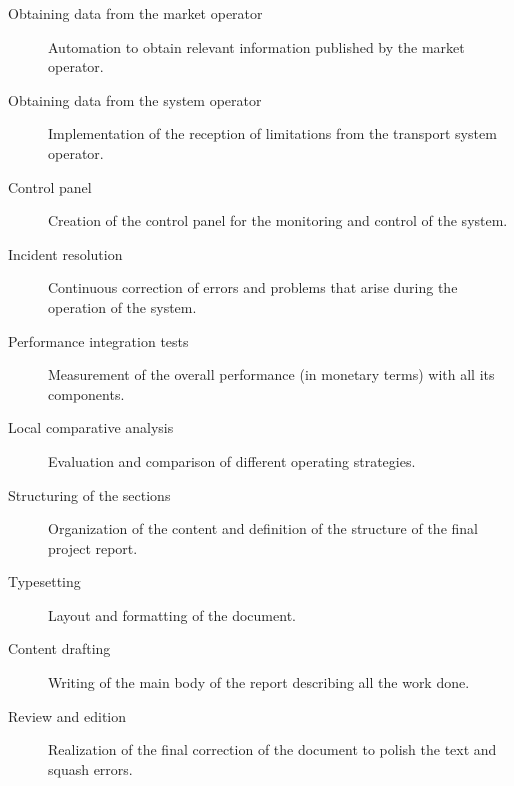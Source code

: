 \begin{description}
  \item[Obtaining data from the market operator] Automation to obtain relevant information published by the market operator.

  \item[Obtaining data from the system operator] Implementation of the reception of limitations from the transport system operator.

  \item[Control panel] Creation of the control panel for the monitoring and control of the system.

  \item[Incident resolution] Continuous correction of errors and problems that arise during the operation of the system.

  \item[Performance integration tests] Measurement of the overall performance (in monetary terms) with all its components.

  \item[Local comparative analysis] Evaluation and comparison of different operating strategies.

  \item[Structuring of the sections] Organization of the content and definition of the structure of the final project report.

  \item[Typesetting] Layout and formatting of the document.

  \item[Content drafting] Writing of the main body of the report describing all the work done.

  \item[Review and edition] Realization of the final correction of the document to polish the text and squash errors.

\end{description}
